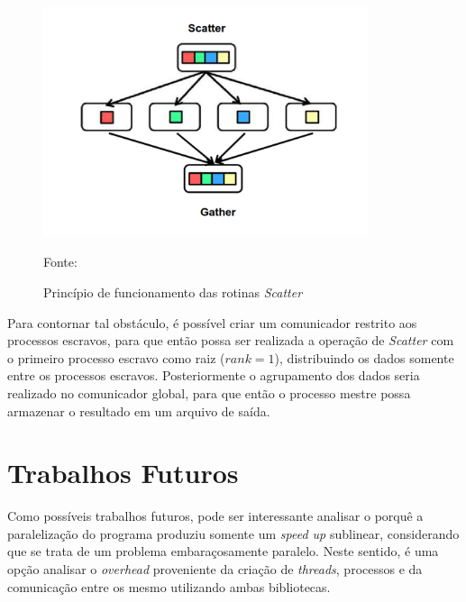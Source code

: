 \documentclass[a4paper, 12pt]{article}
\begin{document}
\begin{figure}[H]
    \centering
    \includegraphics[width=0.85\textwidth]{Images/scatterv.pdf}
    \caption{Princípio de funcionamento das rotinas \emph{Scatter}}
    \vspace{0.2cm}
    \hspace*{15pt}\hbox{\small Fonte:}\\
    \label{fig:map7}
\end{figure}


Para contornar tal obstáculo, é possível criar um comunicador restrito aos processos escravos, para que então possa ser realizada a operação de \emph{Scatter} com o primeiro processo escravo como raiz (\(rank = 1\)), distribuindo os dados somente entre os processos escravos. Posteriormente o agrupamento dos dados seria realizado no comunicador global, para que então o processo mestre possa armazenar o resultado em um arquivo de saída.

\section{Trabalhos Futuros}

Como possíveis trabalhos futuros, pode ser interessante analisar o porquê a paralelização do programa produziu somente um \emph{speed up} sublinear, considerando que se trata de um problema embaraçosamente paralelo. Neste sentido, é uma opção analisar o \emph{overhead} proveniente da criação de \emph{threads}, processos e da comunicação entre os mesmo utilizando ambas bibliotecas.
\end{document}
